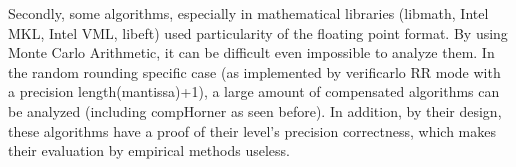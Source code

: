 Secondly, some algorithms, especially in mathematical libraries (libmath, Intel MKL, Intel VML, libeft) used particularity of the floating point format. By using Monte Carlo Arithmetic, it can be difficult even impossible to analyze them. In the random rounding specific case (as implemented by verificarlo RR mode with a precision length(mantissa)+1), a large amount of compensated algorithms can be analyzed (including compHorner as seen before). In addition, by their design, these algorithms have a proof of their level's precision correctness, which makes their evaluation by empirical methods useless.


